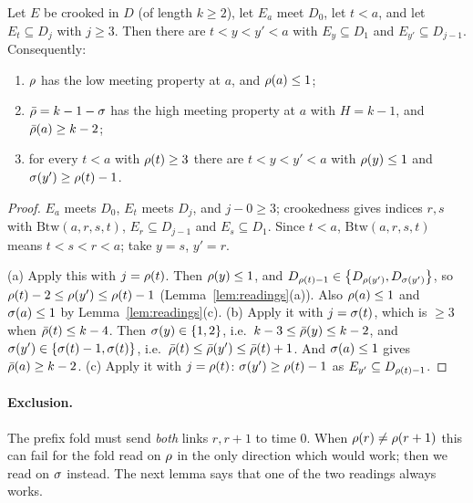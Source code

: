 \begin{lemma}\label{lem:meet-low}
Let $E$ be crooked in $D$ (of length $k\ge2$), let $E_a$ meet $D_0$, let $t<a$, and let $E_t\subseteq D_j$ with $j\ge3$. Then there are
$t<y<y'<a$ with $E_y\subseteq D_1$ and $E_{y'}\subseteq D_{j-1}$. Consequently:
\begin{enumerate}[label=(\alph*)]
\item $\rho$ has the low meeting property at $a$, and $\rho(a)\le1$;
\item $\bar{\rho}=k-1-\sigma$ has the high meeting property at $a$ with $H=k-1$, and $\bar{\rho}(a)\ge k-2$;
\item for every $t<a$ with $\rho(t)\ge3$ there are $t<y<y'<a$ with $\rho(y)\le1$ and $\sigma(y')\ge\rho(t)-1$.
\end{enumerate}
\end{lemma}

\begin{proof}
$E_a$ meets $D_0$, $E_t$ meets $D_j$, and $j-0\ge3$; crookedness gives indices $r,s$ with $\mathrm{Btw}(a,r,s,t)$, $E_r\subseteq D_{j-1}$
and $E_s\subseteq D_1$. Since $t<a$, $\mathrm{Btw}(a,r,s,t)$ means $t<s<r<a$; take $y=s$, $y'=r$.

(a) Apply this with $j=\rho(t)$. Then $\rho(y)\le1$, and $D_{\rho(t)-1}\in\left\{ D_{\rho(y')},D_{\sigma(y')} \right\}$, so $\rho(t)-2\le\rho(y')\le\rho(t)-1$
(Lemma~\ref{lem:readings}(a)). Also $\rho(a)\le1$ and $\sigma(a)\le1$ by Lemma~\ref{lem:readings}(c).
(b) Apply it with $j=\sigma(t)$, which is $\ge3$ when $\bar{\rho}(t)\le k-4$. Then $\sigma(y)\in\left\{ 1,2 \right\}$, i.e.\ $k-3\le\bar{\rho}(y)\le k-2$, and
$\sigma(y')\in\left\{ \sigma(t)-1,\sigma(t) \right\}$, i.e.\ $\bar{\rho}(t)\le\bar{\rho}(y')\le\bar{\rho}(t)+1$. And $\sigma(a)\le1$ gives $\bar{\rho}(a)\ge k-2$.
(c) Apply it with $j=\rho(t)$: $\sigma(y')\ge\rho(t)-1$ as $E_{y'}\subseteq D_{\rho(t)-1}$.
\end{proof}


\paragraph{Exclusion.} The prefix fold must send \emph{both} links $r,r+1$ to time $0$. When $\rho(r)\ne\rho(r+1)$ this can fail for
the fold read on $\rho$ in the only direction which would work; then we read on $\sigma$ instead. The next lemma says that one of the two
readings always works.

